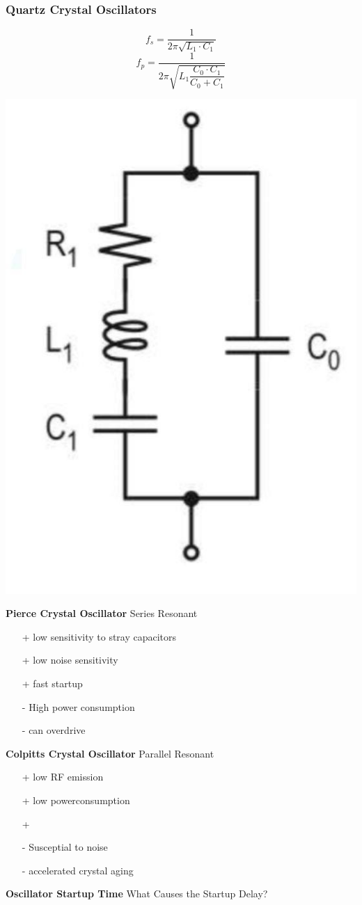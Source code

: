 \subsubsection{Quartz Crystal Oscillators }
\begin{minipage}{0.5\linewidth}
    \[ f_s=\dfrac{1}{2\pi \sqrt{L_1 \cdot C_1}} \]
    \[ f_p=\dfrac{1}{2\pi \sqrt{L_1 \dfrac{C_0 \cdot C_1}{C_0 + C_1}}} \]
\end{minipage}
\begin{minipage}{0.5\linewidth}
    \includegraphics[width=0.3\linewidth]{images/QuartzESB} 
\end{minipage}
\begin{multicols}{2}
    \begin{minipage}{\linewidth}
        \textbf{Pierce Crystal Oscillator}\newline
        Series Resonant
        \begin{itemize}
            \item [+] low sensitivity to stray capacitors
            \item [+] low noise sensitivity
            \item [+] fast startup
            \item [-] High power consumption
            \item [-] can overdrive
        \end{itemize}
    \end{minipage}
    
    \begin{minipage}{\linewidth}
        \textbf{Colpitts Crystal Oscillator}\newline
       Parallel Resonant
        \begin{itemize}
            \item [+] low RF emission
            \item [+] low powerconsumption
            \item [+] 
            \item [-] Susceptial to noise
            \item [-] accelerated crystal aging
        \end{itemize}
    \end{minipage}
\end{multicols}

\textbf{Oscillator Startup Time }\newline
What Causes the Startup Delay?\newline

\clearpage
\pagebreak